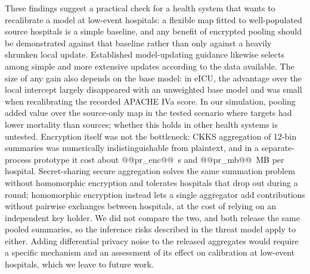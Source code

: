 \documentclass[11pt]{article}
\begin{document}
These findings suggest a practical check for a health system that wants to recalibrate a model at low-event hospitals: a flexible map fitted to well-populated source hospitals is a simple baseline, and any benefit of encrypted pooling should be demonstrated against that baseline rather than only against a heavily shrunken local update. Established model-updating guidance likewise selects among simple and more extensive updates according to the data available\cite{janssen2008,vergouwe2017}. The size of any gain also depends on the base model: in eICU, the advantage over the local intercept largely disappeared with an unweighted base model and was small when recalibrating the recorded APACHE IVa score. In our simulation, pooling added value over the source-only map in the tested scenario where targets had lower mortality than sources; whether this holds in other health systems is untested. Encryption itself was not the bottleneck: CKKS aggregation of 12-bin summaries was numerically indistinguishable from plaintext, and in a separate-process prototype it cost about @@pr_enc@@~s and @@pr_mb@@~MB per hospital. Secret-sharing secure aggregation solves the same summation problem without homomorphic encryption and tolerates hospitals that drop out during a round\cite{bonawitz2017}; homomorphic encryption instead lets a single aggregator add contributions without pairwise exchanges between hospitals, at the cost of relying on an independent key holder. We did not compare the two, and both release the same pooled summaries, so the inference risks described in the threat model apply to either. Adding differential privacy noise to the released aggregates would require a specific mechanism and an assessment of its effect on calibration at low-event hospitals, which we leave to future work.
\end{document}
